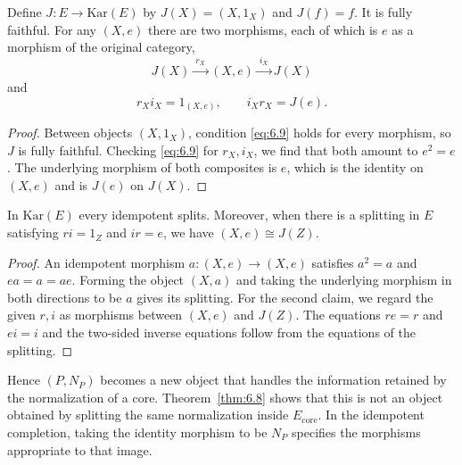 \begin{construction}\label{cons:6.10}

Define $J:E\to\mathrm{Kar}(E)$ by $J(X)=(X,1_X)$ and $J(f)=f$.
It is fully faithful. For any $(X,e)$ there are two morphisms, each of which is $e$ as a
morphism of the original category,
\begin{equation*}
J(X)\xrightarrow{\ r_X\ }(X,e)
\xrightarrow{\ i_X\ }J(X)
\tag{6.10}\label{eq:6.10}
\end{equation*}
and
\begin{equation*}
r_Xi_X=1_{(X,e)},\qquad i_Xr_X=J(e).
\tag{6.11}\label{eq:6.11}
\end{equation*}

\end{construction}

\begin{proof}

Between objects $(X,1_X)$, condition \eqref{eq:6.9} holds for every morphism, so $J$ is
fully faithful.
Checking \eqref{eq:6.9} for $r_X,i_X$, we find that both amount to $e^2=e$.
The underlying morphism of both composites is $e$, which is the identity on $(X,e)$ and is
$J(e)$ on $J(X)$.

\end{proof}

\begin{proposition}\label{prop:6.11}

In $\mathrm{Kar}(E)$ every idempotent splits.
Moreover, when there is a splitting in $E$ satisfying $ri=1_Z$ and $ir=e$, we have
$(X,e)\cong J(Z)$.

\end{proposition}

\begin{proof}

An idempotent morphism $a:(X,e)\to(X,e)$ satisfies $a^2=a$ and $ea=a=ae$.
Forming the object $(X,a)$ and taking the underlying morphism in both directions to be $a$
gives its splitting.
For the second claim, we regard the given $r,i$ as morphisms between $(X,e)$ and $J(Z)$.
The equations $re=r$ and $ei=i$ and the two-sided inverse equations follow from the
equations of the splitting.

\end{proof}

Hence $(P,N_P)$ becomes a new object that handles the information retained by the
normalization of a core.
Theorem~\ref{thm:6.8} shows that this is not an object obtained by splitting the same
normalization inside $E_{\mathrm{core}}$.
In the idempotent completion, taking the identity morphism to be $N_P$ specifies the
morphisms appropriate to that image.

